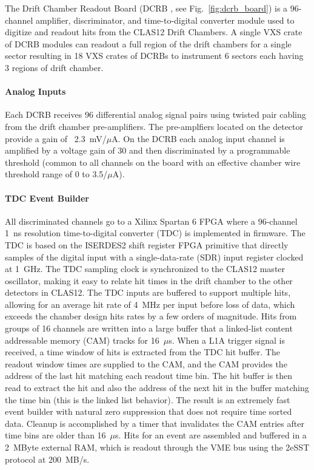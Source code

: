 The Drift Chamber Readout Board (DCRB \cite{dcrb-ref}, see Fig.~\ref{fig:dcrb_board}) is a 96-channel amplifier, discriminator, and time-to-digital converter module used to digitize and readout hits from the CLAS12 Drift Chambers. A single VXS crate of DCRB modules can readout a full region of the drift chambers for a single sector resulting in 18 VXS crates of DCRBs to instrument 6 sectors each having 3 regions of drift chamber.

\paragraph{Analog Inputs}
Each DCRB receives 96 differential analog signal pairs using twisted pair cabling from the drift chamber pre-amplifiers. The pre-amplfiers located on the detector provide a gain of ~2.3~mV/$\mu$A. On the DCRB each analog input channel is amplified by a voltage gain of 30 and then discriminated by a programmable threshold (common to all channels on the board with an effective chamber wire threshold range of 0 to 3.5/$\mu$A).

\paragraph{TDC Event Builder}
All discriminated channels go to a Xilinx Spartan 6 FPGA where a 96-channel 1~ns resolution time-to-digital converter (TDC) is implemented in firmware. The TDC is based on the ISERDES2 shift register FPGA primitive that directly samples of the digital input with a single-data-rate (SDR) input register clocked at 1~GHz. The TDC sampling clock is synchronized to the CLAS12 master oscillator, making it easy to relate hit times in the drift chamber to the other detectors in CLAS12. The TDC inputs are buffered to support multiple hits, allowing for an average hit rate of 4~MHz per input before loss of data, which exceeds the chamber design hits rates by a few orders of magnitude. Hits from groups of 16 channels are written into a large buffer that a linked-list content addressable memory (CAM) tracks for 16~$\mu$s. When a L1A trigger signal is received, a time window of hits is extracted from the TDC hit buffer. The readout window times are supplied to the CAM, and the CAM provides the address of the last hit matching each readout time bin. The hit buffer is then read to extract the hit and also the address of the next hit in the buffer matching the time bin (this is the linked list behavior). The result is an extremely fast event builder with natural zero suppression that does not require time sorted data. Cleanup is accomplished by a timer that invalidates the CAM entries after time bins are older than 16~$\mu$s. Hits for an event are assembled and buffered in a 2~MByte external RAM, which is readout through the VME bus using the 2eSST protocol at 200~MB/s.

